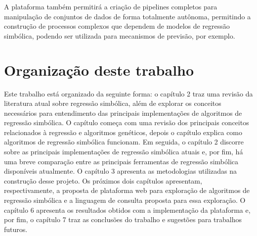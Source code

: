 A plataforma também permitirá a criação de pipelines completos para manipulação de conjuntos de dados de forma totalmente autônoma, permitindo a construção de processos complexos que dependem de modelos de regressão simbólica, podendo ser utilizada para mecanismos de previsão, por exemplo.

\section{Organização deste trabalho}
Este trabalho está organizado da seguinte forma: o capítulo 2 traz uma revisão da literatura atual sobre regressão simbólica, além de explorar os conceitos necessários para entendimento das principais implementações de algoritmos de regressão simbólica. O capítulo começa com uma revisão dos principais conceitos relacionados à regressão e algoritmos genéticos, depois o capítulo explica como algoritmos de regressão simbólica funcionam. Em seguida, o capítulo 2 discorre sobre as principais implementações de regressão simbólica atuais e, por fim, há uma breve comparação entre as principais ferramentas de regressão simbólica disponíveis atualmente. O capítulo 3 apresenta as metodologias utilizadas na construção desse projeto. Os próximos dois capítulos apresentam, respectivamente, a proposta de plataforma web para exploração de algoritmos de regressão simbólica e a linguagem de consulta proposta para essa exploração. O capítulo 6 apresenta os resultados obtidos com a implementação da plataforma e, por fim, o capítulo 7 traz as conclusões do trabalho e sugestões para trabalhos futuros.
